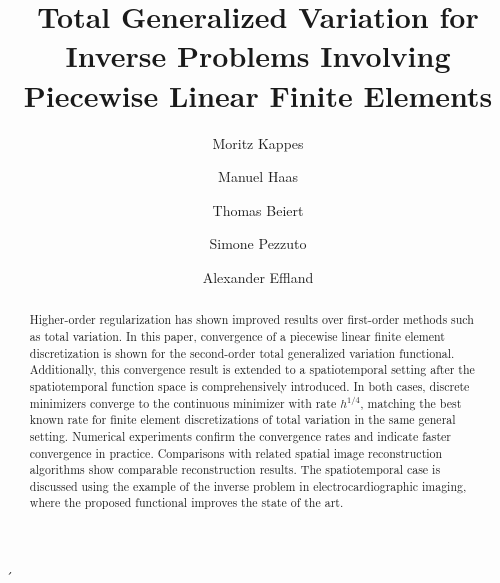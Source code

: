 \documentclass{article}
\title{Total Generalized Variation for Inverse Problems Involving Piecewise Linear Finite Elements}
\author{
	Moritz Kappes\footnotemark[1]
	\and Manuel Haas\footnotemark[1]
	\and Thomas Beiert\footnotemark[2]
	\and Simone Pezzuto\footnotemark[3]
	\and Alexander Effland\footnotemark[1]
}
\begin{document}
	
	\maketitle
	
	\renewcommand{\thefootnote}{\fnsymbol{footnote}}
	
	
	\renewcommand{\thefootnote}{\arabic{footnote}}
	
	\begin{abstract}
		Higher-order regularization has shown improved results over first-order methods such as total variation.
		In this paper, convergence of a piecewise linear finite element discretization is shown for the second-order total generalized variation functional.
		Additionally, this convergence result is extended to a spatiotemporal setting after the spatiotemporal function space is comprehensively introduced.
		In both cases, discrete minimizers converge to the continuous minimizer with rate $h^{1/4}$, matching the best known rate for finite element discretizations of total variation in the same general setting.
		Numerical experiments confirm the convergence rates and indicate faster convergence in practice.
		Comparisons with related spatial image reconstruction algorithms show comparable reconstruction results.
		The spatiotemporal case is discussed using the example of the inverse problem in electrocardiographic imaging, where the proposed functional improves the state of the art.
	\end{abstract}
	´
\end{document}

